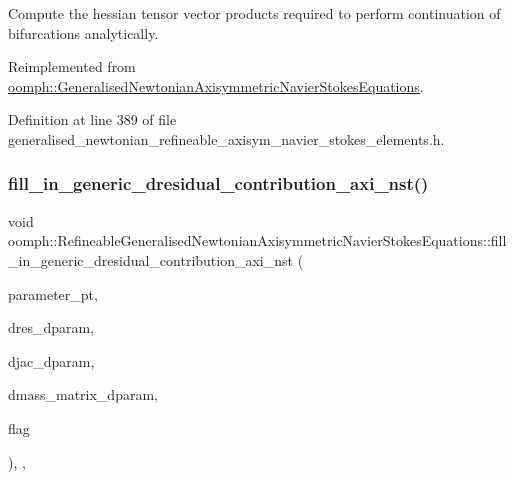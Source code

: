 Compute the hessian tensor vector products required to perform continuation of bifurcations analytically. 



Reimplemented from \hyperlink{classoomph_1_1GeneralisedNewtonianAxisymmetricNavierStokesEquations_a2087bbf2d46364b9dc414a7ca90f25de}{oomph\+::\+Generalised\+Newtonian\+Axisymmetric\+Navier\+Stokes\+Equations}.



Definition at line 389 of file generalised\+\_\+newtonian\+\_\+refineable\+\_\+axisym\+\_\+navier\+\_\+stokes\+\_\+elements.\+h.

\mbox{\label{classoomph_1_1RefineableGeneralisedNewtonianAxisymmetricNavierStokesEquations_a5c48a485d233b8932b58a46138d34241}} 
\subsubsection{\texorpdfstring{fill\+\_\+in\+\_\+generic\+\_\+dresidual\+\_\+contribution\+\_\+axi\+\_\+nst()}{fill\_in\_generic\_dresidual\_contribution\_axi\_nst()}}
{\footnotesize\ttfamily void oomph\+::\+Refineable\+Generalised\+Newtonian\+Axisymmetric\+Navier\+Stokes\+Equations\+::fill\+\_\+in\+\_\+generic\+\_\+dresidual\+\_\+contribution\+\_\+axi\+\_\+nst (\begin{DoxyParamCaption}\item[{double $\ast$const \&}]{parameter\+\_\+pt,  }\item[{\hyperlink{classoomph_1_1Vector}{Vector}$<$ double $>$ \&}]{dres\+\_\+dparam,  }\item[{\hyperlink{classoomph_1_1DenseMatrix}{Dense\+Matrix}$<$ double $>$ \&}]{djac\+\_\+dparam,  }\item[{\hyperlink{classoomph_1_1DenseMatrix}{Dense\+Matrix}$<$ double $>$ \&}]{dmass\+\_\+matrix\+\_\+dparam,  }\item[{unsigned}]{flag }\end{DoxyParamCaption})\hspace{0.3cm}{\ttfamily [inline]}, {\ttfamily [private]}, {\ttfamily [virtual]}}



